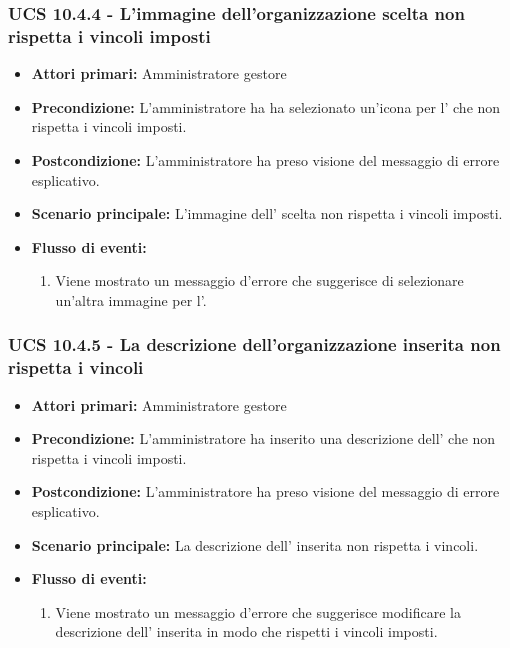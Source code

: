 \subsubsection{UCS 10.4.4 - L'immagine dell'organizzazione scelta non rispetta i vincoli imposti}%
\begin{itemize}
\item \textbf{Attori primari:} Amministratore gestore
\item \textbf{Precondizione:} L'amministratore ha ha selezionato un'icona per l' che non rispetta i vincoli imposti.
\item \textbf{Postcondizione:} L'amministratore ha preso visione del messaggio di errore esplicativo.
\item \textbf{Scenario principale:} L'immagine dell' scelta non rispetta i vincoli imposti.
\item \textbf{Flusso di eventi:}
    \begin{enumerate}
    \item Viene mostrato un messaggio d'errore che suggerisce di selezionare un'altra immagine per l'.
    \end{enumerate} 
\end{itemize}

\subsubsection{UCS 10.4.5 - La descrizione dell'organizzazione inserita non rispetta i vincoli}%
\begin{itemize}
\item \textbf{Attori primari:} Amministratore gestore
\item \textbf{Precondizione:} L'amministratore ha inserito una descrizione dell' che non rispetta i vincoli imposti.
\item \textbf{Postcondizione:} L'amministratore ha preso visione del messaggio di errore esplicativo.
\item \textbf{Scenario principale:} La descrizione dell' inserita non rispetta i vincoli.
\item \textbf{Flusso di eventi:}
    \begin{enumerate}
    \item Viene mostrato un messaggio d'errore che suggerisce modificare la descrizione dell' inserita in modo che rispetti i vincoli imposti.
    \end{enumerate} 
\end{itemize}

